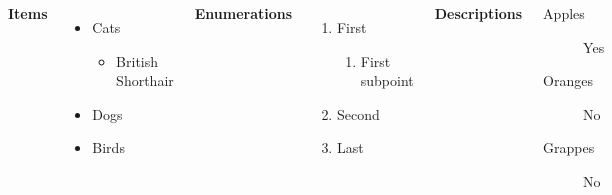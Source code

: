 \documentclass[
11pt,notheorems,hyperref={pdfauthor=Maghfira Ramadhani}
]{beamer}
\begin{document}
\begin{frame}
    \begin{columns}[T,onlytextwidth]
      \textbf{Items}
      \begin{itemize}
        \item Cats 
        \begin{itemize}
            \item British Shorthair
        \end{itemize}
        \item Dogs \item Birds
      \end{itemize}

      \textbf{Enumerations}
      \begin{enumerate}
        \item First 
        \begin{enumerate}
            \item First subpoint
        \end{enumerate}
        \item Second \item Last
      \end{enumerate}

      \textbf{Descriptions}
      \begin{description}
        \item[Apples] Yes \item[Oranges] No \item[Grappes] No
      \end{description}
\end{columns}
\end{frame}
\end{document}
